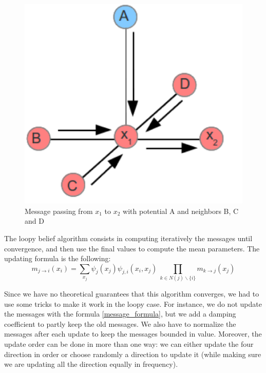 \documentclass[a4paper]{article}
\begin{document}
    \begin{figure}[h]
    	\centering
    	\includegraphics[scale=0.65]{messages}
    	\caption{Message passing from $x_1$ to $x_2$ with potential A and neighbors B, C and D}
        \label{messages}
    \end{figure}
    
        
    The loopy belief algorithm consists in computing iteratively the messages until convergence, and then use the final values to compute the mean parameters. The updating formula is the following:
        \begin{equation}
            m_{j \rightarrow i} (x_i) = \sum\limits_{x_j} \psi_j(x_j)\psi_{j,i}(x_i,x_j)  \   \prod\limits_{k \in N(j)\backslash \{i\} } m_{k \rightarrow j} (x_j)
            \label{message_formula}
        \end{equation}
    
    Since we have no theoretical guarantees that this algorithm converges, we had to use some tricks to make it work in the loopy case. For instance, we do not update the messages with the formula \ref{message_formula}, but we add a damping coefficient to partly keep the old messages. We also have to normalize the messages after each update to keep the messages bounded in value. Moreover, the update order can be done in more than one way: we can either update the four direction in order or choose randomly a direction to update it (while making sure we are updating all the direction equally in frequency).
    
\end{document}

